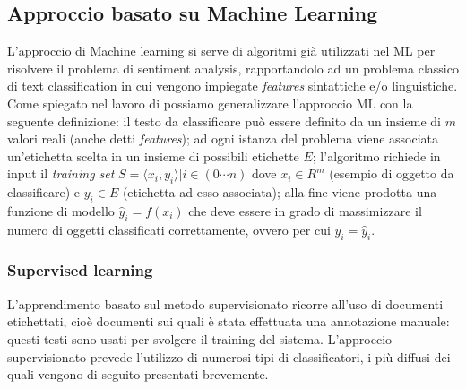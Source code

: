 \documentclass[a4paper,12pt,openright,twoside]{report}
\theoremstyle{definition}
\begin{document}
\subsection{Approccio basato su Machine Learning}
L'approccio di Machine learning si serve di algoritmi già utilizzati nel ML per risolvere il problema
di sentiment analysis, rapportandolo ad un problema classico di text classification 
in cui vengono impiegate
\emph{features} sintattiche e/o linguistiche.
Come spiegato nel lavoro di \cite{Melloncelli}
possiamo generalizzare l'approccio ML con la seguente
definizione: il testo da classificare può essere definito da un insieme
di $m$ valori reali (anche detti \emph{features}); ad ogni istanza del problema viene associata
un'etichetta scelta in un insieme di possibili etichette $E$; l’algoritmo richiede in input il
\emph{training set} $S = {\langle x_i , y_i\rangle | i \in (0 \cdots n)}$ dove $x_i \in R^m$
(esempio di oggetto da classificare)
e $y_i \in E$ (etichetta ad esso associata); alla fine viene prodotta una funzione di modello 
$\hat{y}_i = f(x_i)$ che deve essere in grado di massimizzare il numero di oggetti classificati
correttamente, ovvero per cui $y_i = \hat{y}_i$.

\subsubsection{Supervised learning}
L’apprendimento basato sul metodo supervisionato ricorre all'uso di documenti etichettati,
cioè documenti sui quali è stata effettuata una annotazione manuale: questi 
testi sono usati
per svolgere il training del sistema. L'approccio supervisionato prevede l'utilizzo
di numerosi tipi di classificatori, i più diffusi dei quali vengono di seguito
presentati brevemente.
\end{document}
